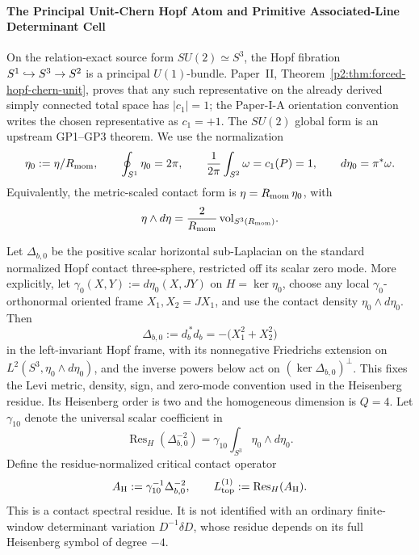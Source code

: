 \documentclass[12pt,a4paper]{article}
\begin{document}
\paragraph{The Principal Unit-Chern Hopf Atom and Primitive Associated-Line Determinant Cell}

On the relation-exact source form \(SU(2)\simeq S^3\), the Hopf fibration
\(S^1\hookrightarrow S^3\to S^2\) is a principal \(U(1)\)-bundle.
Paper~II, Theorem~\ref{p2:thm:forced-hopf-chern-unit}, proves that any such
representative on the already derived simply connected total space has
\(|c_1|=1\); the Paper-I-A orientation convention writes the chosen
representative as \(c_1=+1\).  The \(SU(2)\) global form is an upstream
GP1--GP3 theorem.  We use the normalization
\[
\eta_0:=\eta/R_{\mathrm{mom}},\qquad
\oint_{S^1}\eta_0=2\pi,
\qquad
\frac{1}{2\pi}\int_{S^2}\omega=c_1(P)=1,\qquad d\eta_0=\pi^*\omega.
\]
Equivalently, the metric-scaled contact form is \(\eta=R_{\mathrm{mom}}\,\eta_0\), with
\[
\eta\wedge d\eta=\frac{2}{R_{\mathrm{mom}}}\,\mathrm{vol}_{S^3(R_{\mathrm{mom}})}.
\]


\begin{definition}
\label{p3:def:primitive-contact-residue}
Let \(\Delta_{b,0}\) be the positive scalar horizontal sub-Laplacian on the
standard normalized Hopf contact three-sphere, restricted off its scalar zero
mode.  More explicitly, let
\(\gamma_0(X,Y):=d\eta_0(X,JY)\) on \(H=\ker\eta_0\), choose any local
\(\gamma_0\)-orthonormal oriented frame \(X_1,X_2=JX_1\), and use the contact
density \(\eta_0\wedge d\eta_0\).  Then
\[
 \Delta_{b,0}:=d_{b}^{\,*}d_b
 =-\bigl(X_1^2+X_2^2\bigr)
\]
in the left-invariant Hopf frame, with its nonnegative Friedrichs extension
on \(L^2(S^3,\eta_0\wedge d\eta_0)\), and the inverse powers below act on
\((\ker\Delta_{b,0})^\perp\).  This fixes the Levi metric, density, sign,
and zero-mode convention used in the Heisenberg residue.  Its Heisenberg
order is two and the homogeneous dimension is \(Q=4\).
Let \(\gamma_{10}\) denote the universal scalar coefficient in
\[
 \operatorname{Res}_{H}(\Delta_{b,0}^{-2})
 =\gamma_{10}\int_{S^3}\eta_0\wedge d\eta_0.
\]
Define the residue-normalized critical contact operator
\begin{equation}
\label{p3:eq:primitive-contact-residue}
 A_{\rm H}:=\gamma_{10}^{-1}\Delta_{b,0}^{-2},
 \qquad
 L_{\rm top}^{(1)}:=\operatorname{Res}_{H}(A_{\rm H}).
\end{equation}
This is a contact spectral residue.  It is not identified with an ordinary
finite-window determinant variation \(D^{-1}\delta D\), whose residue depends
on its full Heisenberg symbol of degree \(-4\).
\end{definition}
\end{document}

